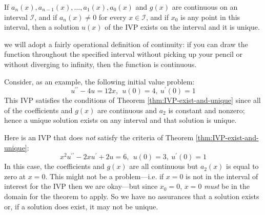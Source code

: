 \begin{theorem}
If $a_n(x),a_{n-1}(x),\dots,a_1(x),a_0(x)$ and $g(x)$ are continuous on an interval $\mathcal{I}$, and if $a_n(x) \ne 0$ for every $x \in \mathcal{I}$, and if $x_0$ is any point in this interval, then a solution $u(x)$ of the IVP exists on the interval and it is unique.
\label{thm:IVP-exist-and-unique}
\end{theorem}
 we will adopt a fairly operational definition of continuity: if you can draw the function throughout the specified interval without picking up your pencil or without diverging to infinity, then the function is continuous. 

Consider, as an example, the following initial value problem:
\begin{equation}
u^{\prime \prime}-4u = 12x, \ \ u(0)=4, \ u^{\prime}(0)=1
\label{eq:lec3-ex1}
\end{equation}
This IVP satisfies the conditions of Theorem \ref{thm:IVP-exist-and-unique} since all of the coefficients and $g(x)$ are continuous and $a_2$ is constant and nonzero; hence a unique solution exists on any interval and that solution is unique.

Here is an IVP that does \emph{not} satisfy the criteria of Theorem \ref{thm:IVP-exist-and-unique}:
\begin{equation}
x^2u^{\prime \prime} - 2xu^{\prime}+2u=6, \ \ u(0)=3, \ u^{\prime}(0)=1
\label{eq:lec3-ex2}
\end{equation}
\noindent In this case, the coefficients and $g(x)$ are all continuous but $a_2(x)$ is equal to zero at $x=0$.  This might not be a problem---i.e. if $x=0$ is not in the interval of interest for the IVP then we are okay---but since $x_0=0$, $x=0$ \emph{must} be in the domain for the theorem to apply.  So we have no assurances that a solution exists or, if a solution does exist, it may not be unique.

